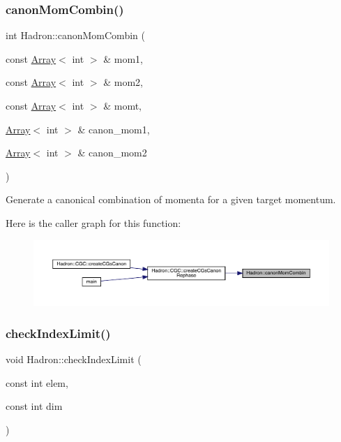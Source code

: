 \subsubsection{\texorpdfstring{canonMomCombin()}{canonMomCombin()}}
{\footnotesize\ttfamily int Hadron\+::canon\+Mom\+Combin (\begin{DoxyParamCaption}\item[{const \mbox{\hyperlink{classXMLArray_1_1Array}{Array}}$<$ int $>$ \&}]{mom1,  }\item[{const \mbox{\hyperlink{classXMLArray_1_1Array}{Array}}$<$ int $>$ \&}]{mom2,  }\item[{const \mbox{\hyperlink{classXMLArray_1_1Array}{Array}}$<$ int $>$ \&}]{momt,  }\item[{\mbox{\hyperlink{classXMLArray_1_1Array}{Array}}$<$ int $>$ \&}]{canon\+\_\+mom1,  }\item[{\mbox{\hyperlink{classXMLArray_1_1Array}{Array}}$<$ int $>$ \&}]{canon\+\_\+mom2 }\end{DoxyParamCaption})}



Generate a canonical combination of momenta for a given target momentum. 

Here is the caller graph for this function\+:
\nopagebreak
\begin{figure}[H]
\begin{center}
\leavevmode
\includegraphics[width=350pt]{d1/daf/namespaceHadron_ab874ef7e96f2c243de41a6ef639bf3c3_icgraph}
\end{center}
\end{figure}
\mbox{\label{namespaceHadron_a32841ac341a167a00453d3846a386fd9}} 
\subsubsection{\texorpdfstring{checkIndexLimit()}{checkIndexLimit()}}
{\footnotesize\ttfamily void Hadron\+::check\+Index\+Limit (\begin{DoxyParamCaption}\item[{const int}]{elem,  }\item[{const int}]{dim }\end{DoxyParamCaption})}




